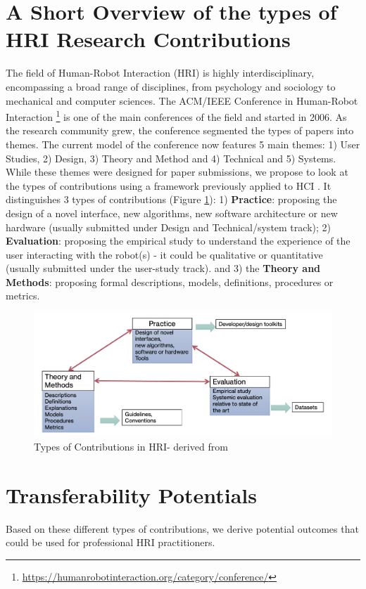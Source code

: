 \documentclass[letterpaper]{article} %
\begin{document}
\section{A Short Overview of the types of HRI Research Contributions}
The field of Human-Robot Interaction (HRI) is highly interdisciplinary, encompassing a broad range of disciplines, from psychology and sociology to mechanical and computer sciences.
The ACM/IEEE Conference in Human-Robot Interaction \footnote{\url{https://humanrobotinteraction.org/category/conference/}} is one of the main conferences of the field and started in 2006. As the research community grew, the conference segmented the types of papers into themes. The current model of the conference now features 5 main themes: 1) User Studies, 2) Design, 3) Theory and Method and 4) Technical and 5) Systems. 
While these themes were designed for paper submissions, we propose to look at the types of contributions using a framework previously applied to HCI \cite{SReeves}. It distinguishes 3 types of contributions (Figure \ref{fig:tri}):
1) \textbf{Practice}: proposing the design of a novel interface, new algorithms, new software architecture or new hardware (usually submitted under Design and Technical/system track); 2) \textbf{Evaluation}: proposing the empirical study to understand the experience of the user interacting with the robot(s) - it could be qualitative or quantitative (usually submitted under the user-study track). and 3) the \textbf{Theory and Methods}: proposing formal descriptions, models, definitions, procedures or metrics. 

\begin{figure}
    \centering
    \includegraphics[width=\linewidth]{flow.png}
    \caption{Types of Contributions in HRI- derived from \cite{SReeves}}
    \label{fig:tri}
\end{figure}

\section{Transferability Potentials}
Based on these different types of contributions, we derive potential outcomes that could be used for professional HRI practitioners.  
\end{document}
